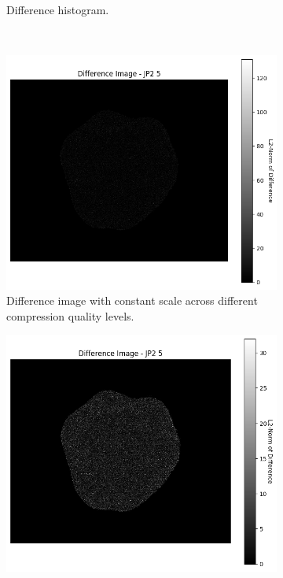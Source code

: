 \begin{figure}[htb]
\begin{subfigure}[b]{0.48\textwidth}
        \caption{Difference histogram.}
        \label{fig:img_quality_comp_jp2_5_histo}
    \end{subfigure}
    \\
    \begin{subfigure}[b]{0.48\textwidth}
        \centering
        \includegraphics[width=\textwidth]{doc/thesis/0_figures/compare_quality/set1/jp2_5_diff_heatmap.png}
        \caption{Difference image with constant scale across different compression quality levels.}
        \label{fig:img_quality_comp_jp2_5_diff}
    \end{subfigure}
    \begin{subfigure}[b]{0.48\textwidth}
        \centering
        \includegraphics[width=\textwidth]{doc/thesis/0_figures/compare_quality/set1/jp2_5_diff_heatmap_rel.png}

\end{subfigure}
\end{figure}
